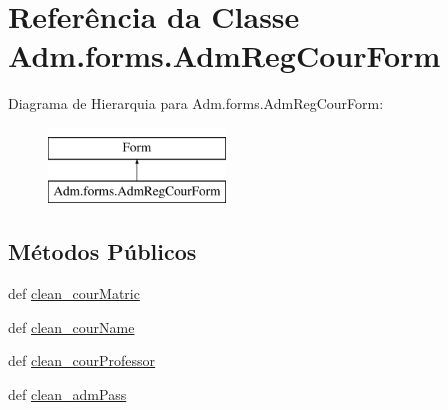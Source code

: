 \hypertarget{classAdm_1_1forms_1_1AdmRegCourForm}{\section{Referência da Classe Adm.\-forms.\-Adm\-Reg\-Cour\-Form}
\label{classAdm_1_1forms_1_1AdmRegCourForm}
}
Diagrama de Hierarquia para Adm.\-forms.\-Adm\-Reg\-Cour\-Form\-:\begin{figure}[H]
\begin{center}
\leavevmode
\includegraphics[height=2.000000cm]{df/d14/classAdm_1_1forms_1_1AdmRegCourForm}
\end{center}
\end{figure}
\subsection*{Métodos Públicos}
\begin{DoxyCompactItemize}
\item 
def \hyperlink{classAdm_1_1forms_1_1AdmRegCourForm_a9f46a4ae30627a99585378bb8cf7931f}{clean\-\_\-cour\-Matric}
\item 
def \hyperlink{classAdm_1_1forms_1_1AdmRegCourForm_a44ddd3e1d929aeb8f8ba24392ff913db}{clean\-\_\-cour\-Name}
\item 
def \hyperlink{classAdm_1_1forms_1_1AdmRegCourForm_ad8ef9f5e19392d2f1d3688ca0db794e2}{clean\-\_\-cour\-Professor}
\item 
def \hyperlink{classAdm_1_1forms_1_1AdmRegCourForm_a1f95b0682cc26239d83ce85a524bed8a}{clean\-\_\-adm\-Pass}
\end{DoxyCompactItemize}
